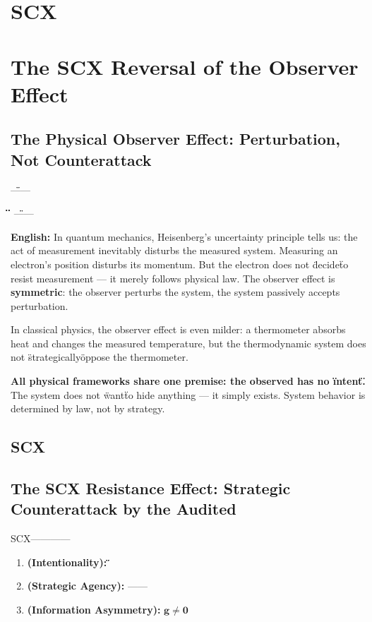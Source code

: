 \documentclass[12pt,a4paper]{article}
\theoremstyle{remark}
\newcommand{\g}{\mathbf{g}}
\begin{document}
\section{SCX}
\section{The SCX Reversal of the Observer Effect}

\subsection{}
\subsection{The Physical Observer Effect: Perturbation, Not Counterattack}

\noindent
\textbf{} \"\"——\textbf{}

\"\"

\textbf{\"\"} \"\"——

\vspace{6pt}
\noindent
\textbf{English:} In quantum mechanics, Heisenberg's uncertainty principle tells us: the act of measurement inevitably disturbs the measured system. Measuring an electron's position disturbs its momentum. But the electron does not \"decide\" to resist measurement — it merely follows physical law. The observer effect is \textbf{symmetric}: the observer perturbs the system, the system passively accepts perturbation.

In classical physics, the observer effect is even milder: a thermometer absorbs heat and changes the measured temperature, but the thermodynamic system does not \"strategically\" oppose the thermometer.

\textbf{All physical frameworks share one premise: the observed has no \"intent.\"} The system does not \"want\" to hide anything — it simply exists. System behavior is determined by law, not by strategy.

\subsection{SCX}
\subsection{The SCX Resistance Effect: Strategic Counterattack by the Audited}

\noindent
\textbf{} SCX————

\begin{enumerate}[label=(\arabic*)]
    \item \textbf{ (Intentionality):} \"\"\"\"
    \item \textbf{ (Strategic Agency):} \textbf{}——
    \item \textbf{ (Information Asymmetry):}  $ \g \neq \mathbf{0} $
\end{enumerate}
\end{document}
